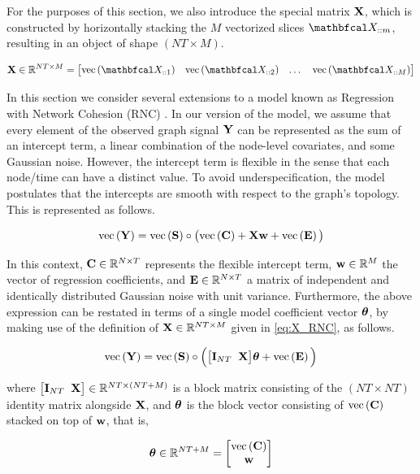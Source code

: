For the purposes of this section, we also introduce the special matrix $\mathbf{X}$, which is constructed by horizontally stacking the $M$ vectorized slices $\Xt_{::m}$, resulting in an object of shape $(NT \times M)$. 

\begin{equation}
    \label{eq:X_RNC}
    \X \in \R^{NT \times M} = \begin{bmatrix} \vecc{\Xt_{::1}} & \vecc{\Xt_{::2}} & \dots & \vecc{\Xt_{::M}} \end{bmatrix}    
\end{equation}

In this section we consider several extensions to a model known as Regression with Network Cohesion (RNC) \citep{Li2019}. In our version of the model, we assume that every element of the observed graph signal $\mathbf{Y}$ can be represented as the sum of an intercept term, a linear combination of the node-level covariates, and some Gaussian noise. However, the intercept term is flexible in the sense that each node/time can have a distinct value. To avoid underspecification, the model postulates that the intercepts are smooth with respect to the graph's topology. This is represented as follows. 

\begin{equation}
    \label{eq:rnc_stat_model_wc}
    \text{\textup{vec}}\left(\mathbf{Y}\right) = \text{\textup{vec}}\left(\mathbf{S}\right) \circ \big( \text{\textup{vec}}\left(\mathbf{C}\right) + \mathbf{X} \mathbf{w}  + \text{\textup{vec}}\left(\mathbf{E}\right) \big)
\end{equation}

In this context, $\mathbf{C} \in \mathbb{R}^{N \times T}$ represents the flexible intercept term, $\mathbf{w} \in \mathbb{R}^{M}$ the vector of regression coefficients, and $\mathbf{E} \in \mathbb{R}^{N \times T}$ a matrix of independent and identically distributed Gaussian noise with unit variance. Furthermore, the above expression can be restated in terms of a single model coefficient vector $\boldsymbol{\theta}$, by making use of the definition of $\mathbf{X} \in \mathbb{R}^{NT \times M}$ given in \cref{eq:X_RNC}, as follows.

\begin{equation}
    \label{eq:rnc_stat_model_theta}
    \text{\textup{vec}}\left(\mathbf{Y}\right) = \text{\textup{vec}}\left(\mathbf{S}\right) \circ \Big( \big[ \mathbf{I}_{NT} \;\; \mathbf{X} \big]\boldsymbol{\theta}  + \text{\textup{vec}}\left(\mathbf{E}\right) \Big)
\end{equation}

where $\big[ \mathbf{I}_{NT} \;\; \mathbf{X} \big] \in \mathbb{R}^{NT \times (NT + M)}$ is a block matrix consisting of the $(NT \times NT)$ identity matrix alongside $\mathbf{X}$, and $\boldsymbol{\theta}$ is the block vector consisting of $\text{\textup{vec}}\left(\mathbf{C}\right)$ stacked on top of $\mathbf{w}$, that is, 

\begin{equation}
    \boldsymbol{\theta} \in \mathbb{R}^{NT + M} = \begin{bmatrix} \text{\textup{vec}}\left(\mathbf{C}\right) \\ \mathbf{w} \end{bmatrix}
\end{equation}

